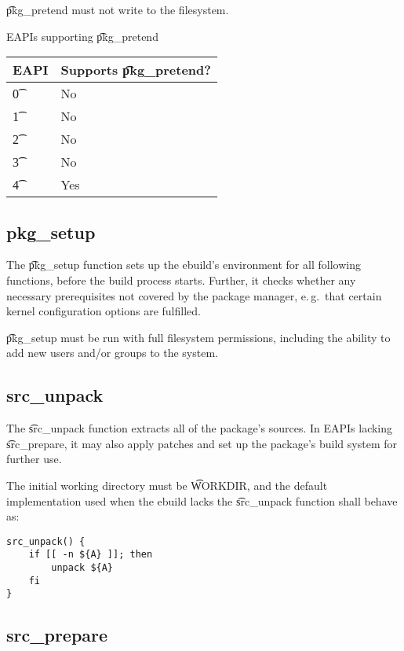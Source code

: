 \t{pkg\_pretend} must not write to the filesystem.

\begin{centertable}{EAPIs supporting \t{pkg\_pretend}} \label{tab:pkg-pretend-table}
    \begin{tabular}{ l l }
        \toprule
        \multicolumn{1}{c}{\textbf{EAPI}} &
        \multicolumn{1}{c}{\textbf{Supports \t{pkg\_pretend}?}} \\
        \midrule
    \t{0} & No \\
    \t{1} & No \\
    \t{2} & No \\
    \t{3} & No \\
    \t{4} & Yes \\
    \bottomrule
    \end{tabular}
\end{centertable}

\subsection{pkg\_setup}
\label{sec:pkg-setup-function}
The \t{pkg\_setup} function sets up the ebuild's environment for all following functions, before
the build process starts. Further, it checks whether any necessary prerequisites not covered
by the package manager, e.\,g.\ that certain kernel configuration options are fulfilled.

\t{pkg\_setup} must be run with full filesystem permissions, including the ability to add new users
and/or groups to the system.

\subsection{src\_unpack}
\label{sec:src-unpack-function}

 The \t{src\_unpack} function extracts all of
the package's sources. In EAPIs lacking \t{src\_prepare}, it may also
apply patches and set up the package's build system for further use.

The initial working directory must be \t{WORKDIR}, and the default implementation used when
the ebuild lacks the \t{src\_unpack} function shall behave as:

\begin{verbatim}
src_unpack() {
    if [[ -n ${A} ]]; then
        unpack ${A}
    fi
}
\end{verbatim}

\subsection{src\_prepare}
\label{sec:src-prepare-function}

